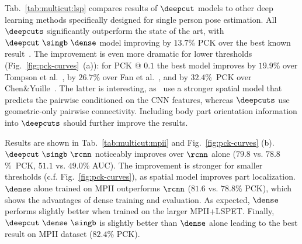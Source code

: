 Tab.~\ref{tab:multicut:lsp} compares results of $\deepcut$ models to
other deep learning methods specifically designed for single person
pose estimation. All $\deepcuts$ significantly outperform the state of
the art, with $\deepcut~\singb~\dense$ model improving by $13.7$\% PCK
over the best known result~\cite{chen14nips}. The improvement is even
more dramatic for lower thresholds (Fig.~\ref{fig:pck-curves}~(a)):
for PCK @ $0.1$ the best model improves by $19.9$\% over Tompson et
al.~\cite{tompson14nips}, by $26.7$\% over Fan et al.~\cite{fan15cvpr},
and by $32.4$\%~PCK over Chen\&Yuille~\cite{chen14nips}. The latter is
interesting, as~\cite{chen14nips} use a stronger spatial model that
predicts the pairwise conditioned on the CNN features, whereas
$\deepcuts$ use geometric-only pairwise connectivity. Including body
part orientation information into $\deepcuts$ should further improve
the results.

 Results are shown in
Tab.~\ref{tab:multicut:mpii} and Fig.~\ref{fig:pck-curves}
(b). $\deepcut~\singb~\rcnn$ noticeably improves over $\rcnn$ alone
($79.8$ vs. $78.8$\%~PCK, $51.1$ vs. $49.0$\% AUC). The improvement is
stronger for smaller thresholds (c.f. Fig.~\ref{fig:pck-curves}), as
spatial model improves part localization. $\dense$ alone trained on
MPII outperforms $\rcnn$ ($81.6$ vs. $78.8$\% PCK), which shows the
advantages of dense training and evaluation. As expected, $\dense$
performs slightly better when trained on the larger
MPII+LSPET. Finally, $\deepcut~\dense~\singb$ is slightly better than
$\dense$ alone leading to the best result on MPII dataset ($82.4$\%
PCK).

